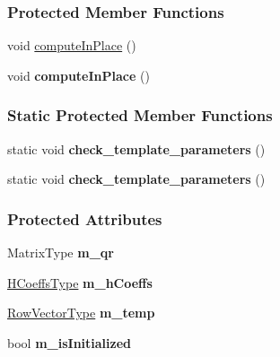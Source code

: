 \subsubsection*{Protected Member Functions}
\begin{DoxyCompactItemize}
\item 
void \hyperlink{group___q_r___module_a3a16530338a734971fc45efb0ef9ac94}{compute\+In\+Place} ()
\item 
\mbox{\label{group___q_r___module_aea6cc1c02f0e913cad8a84e3dbe61857}} 
void {\bfseries compute\+In\+Place} ()
\end{DoxyCompactItemize}
\subsubsection*{Static Protected Member Functions}
\begin{DoxyCompactItemize}
\item 
\mbox{\label{group___q_r___module_ab9ae903a54d86452afaf77531396fc27}} 
static void {\bfseries check\+\_\+template\+\_\+parameters} ()
\item 
\mbox{\label{group___q_r___module_ab9ae903a54d86452afaf77531396fc27}} 
static void {\bfseries check\+\_\+template\+\_\+parameters} ()
\end{DoxyCompactItemize}
\subsubsection*{Protected Attributes}
\begin{DoxyCompactItemize}
\item 
\mbox{\label{group___q_r___module_adb06ba1b2259a00b25b5f0e1d86e22ae}} 
Matrix\+Type {\bfseries m\+\_\+qr}
\item 
\mbox{\label{group___q_r___module_ad5cba8a1c0ad16e52bc8aeda2710013f}} 
\hyperlink{class_eigen_1_1internal_1_1_tensor_lazy_evaluator_writable}{H\+Coeffs\+Type} {\bfseries m\+\_\+h\+Coeffs}
\item 
\mbox{\label{group___q_r___module_a640f06115b8b7ecebac29ca785ff2527}} 
\hyperlink{class_eigen_1_1internal_1_1_tensor_lazy_evaluator_writable}{Row\+Vector\+Type} {\bfseries m\+\_\+temp}
\item 
\mbox{\label{group___q_r___module_aa616849e6a79978091208f4d15046205}} 
bool {\bfseries m\+\_\+is\+Initialized}
\end{DoxyCompactItemize}



